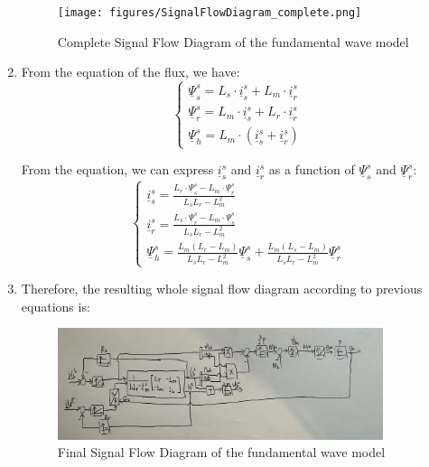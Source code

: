 \documentclass[12pt,a4paper, openany]{book}
\begin{document}
\begin{enumerate}
\begin{figure}[H]
    \centering
    \texttt{[image: figures/SignalFlowDiagram\_complete.png]}
    \caption{Complete Signal Flow Diagram of the fundamental wave model}
    \label{fig:Signal Flow Diagram complete}
\end{figure}
\item 
From the equation of the flux, we have:
\begin{equation}
    \begin{cases}
       \underline{\Psi}_s^s = L_s \cdot \underline{i}_s^s + L_m \cdot \underline{i}_r^s \\
         \underline{\Psi}_r^s = L_m \cdot \underline{i}_s^s + L_r \cdot \underline{i}_r^s\\
         \underline{\Psi}_h^s = L_m \cdot (\underline{i}_s^s + \underline{i}_r^s)
    \end{cases}
\end{equation}

From the equation, we can express $\underline{i}_s^s$ and $\underline{i}_r^s$ as a function of $\underline{\Psi}_s^s$ and $\underline{\Psi}_r^s$:
\begin{equation}
    \begin{cases}
       \underline{i}_s^s = \frac{L_r \cdot \underline{\Psi}_s^s - L_m \cdot \underline{\Psi}_r^s}{L_s L_r - L_m^2} \\
         \underline{i}_r^s = \frac{L_s \cdot \underline{\Psi}_r^s - L_m \cdot \underline{\Psi}_s^s}{L_s L_r - L_m^2}\\
         \underline{\Psi}_h^s=\frac{L_m(L_r-L_m)}{L_sL_r-L_m^2}\underline{\Psi}_s^s+\frac{L_m(L_s-L_m)}{L_sL_r-L_m^2}\underline{\Psi}_r^s
    \end{cases}
\end{equation}
\item 
Therefore, the resulting whole signal flow diagram according to previous equations is:
\begin{figure}[H]
    \centering
    \includegraphics[width=0.9\textwidth]{figures/SignalFlowDiagram_final.png}
    \caption{Final Signal Flow Diagram of the fundamental wave model}
    \label{fig:Signal Flow Diagram final}
\end{figure}
\end{enumerate}
\end{document}
